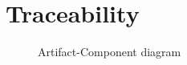 \documentclass[
    english, %
]{VUMIFPSkursinis}
\begin{document}
\section{Traceability}

\begin{figure}[ht]
    \centering
    
    \caption{Artifact-Component diagram}
    \label{artifact-diagram}
\end{figure}

\newlength{\tablewidth}
\setlength{\tablewidth}{0.5\textwidth}


\renewcommand{\thead}[1]{\bfseries\makecell{#1}}
\end{document}
